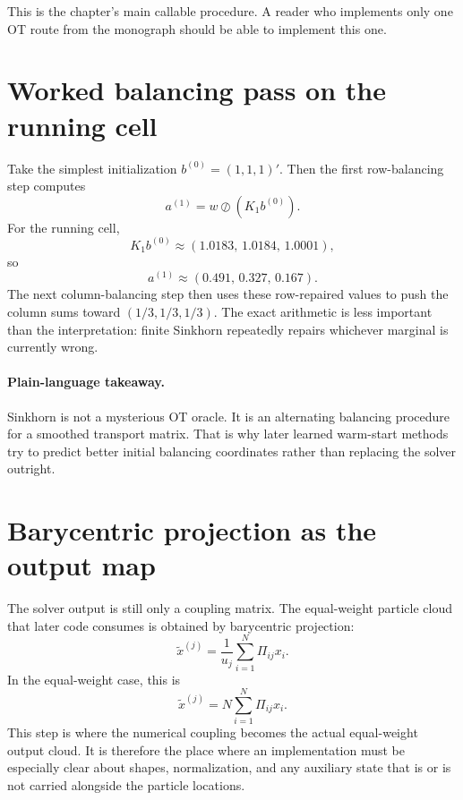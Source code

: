 This is the chapter’s main callable procedure.  A reader who implements only one
OT route from the monograph should be able to implement this one.

\section{Worked balancing pass on the running cell}
\label{sec:bf-eot-worked-balance}

Take the simplest initialization \(b^{(0)}=(1,1,1)'\).  Then the first
row-balancing step computes
\begin{equation}
\label{eq:bf-eot-first-row-balance}
  a^{(1)} = w \oslash (K_1 b^{(0)}).
\end{equation}
For the running cell,
\[
  K_1 b^{(0)}
  \approx
  (1.0183,\,1.0184,\,1.0001),
\]
so
\[
  a^{(1)}
  \approx
  (0.491,\,0.327,\,0.167).
\]
The next column-balancing step then uses these row-repaired values to push the
column sums toward \((1/3,1/3,1/3)\).  The exact arithmetic is less important
than the interpretation: finite Sinkhorn repeatedly repairs whichever marginal is
currently wrong.

\paragraph{Plain-language takeaway.}
Sinkhorn is not a mysterious OT oracle.  It is an alternating balancing procedure
for a smoothed transport matrix.  That is why later learned warm-start methods try
to predict better initial balancing coordinates rather than replacing the solver
outright.

\section{Barycentric projection as the output map}
\label{sec:bf-eot-barycentric}

The solver output is still only a coupling matrix.  The equal-weight particle cloud
that later code consumes is obtained by barycentric projection:
\begin{equation}
\label{eq:bf-eot-barycentric}
  \tilde x^{(j)}
  =
  \frac{1}{u_j}\sum_{i=1}^N \Pi_{ij}x_i.
\end{equation}
In the equal-weight case, this is
\begin{equation}
\label{eq:bf-eot-barycentric-equal}
  \tilde x^{(j)}=N\sum_{i=1}^N \Pi_{ij}x_i.
\end{equation}
This step is where the numerical coupling becomes the actual equal-weight output
cloud.  It is therefore the place where an implementation must be especially clear
about shapes, normalization, and any auxiliary state that is or is not carried
alongside the particle locations.


